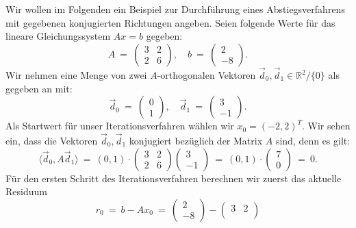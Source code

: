 \begin{example}{}{}
Wir wollen im Folgenden ein Beispiel zur Durchführung eines Abstiegsverfahrens mit gegebenen konjugierten Richtungen angeben.
Seien folgende Werte für das lineare Gleichungssystem $Ax = b$ gegeben:
\begin{equation*}
A \ = \
\begin{pmatrix}
3 & 2\\
2 & 6
\end{pmatrix},
\quad b \ = \ 
\begin{pmatrix}
2\\
-8
\end{pmatrix}.
\end{equation*}
Wir nehmen eine Menge von zwei $A$-orthogonalen Vektoren $\vec{d}_0, \vec{d}_1 \in \mathbb{R}^2 / \lbrace 0 \rbrace$ als gegeben an mit:
\begin{equation*}
\vec{d}_0 \ = \
\begin{pmatrix}
0\\
1
\end{pmatrix},
\quad \vec{d}_1 \ = \ 
\begin{pmatrix}
3\\
-1
\end{pmatrix}.
\end{equation*}
Als Startwert für unser Iterationsverfahren wählen wir $x_0 = (-2, 2)^T$.
Wir sehen ein, dass die Vektoren $\vec{d}_0, \vec{d}_1$ konjugiert bezüglich der Matrix $A$ sind, denn es gilt:
\begin{equation*}
\langle\vec{d}_0, A\vec{d}_1 \rangle \ = \ (0,1)\cdot
\begin{pmatrix}
3 & 2\\
2 & 6
\end{pmatrix}
\begin{pmatrix}
3\\
-1
\end{pmatrix} \ = \ (0,1) \cdot
\begin{pmatrix}
7\\
0
\end{pmatrix} \ = \ 0.
\end{equation*}
Für den ersten Schritt des Iterationsverfahren berechnen wir zuerst das aktuelle Residuum
\begin{equation*}
r_0 \ = \ b - Ax_0 \ = \ 
\begin{pmatrix}
2 \\
-8
\end{pmatrix} - 
\begin{pmatrix}
3 & 2\\

\end{pmatrix}
\end{equation*}
\end{example}
